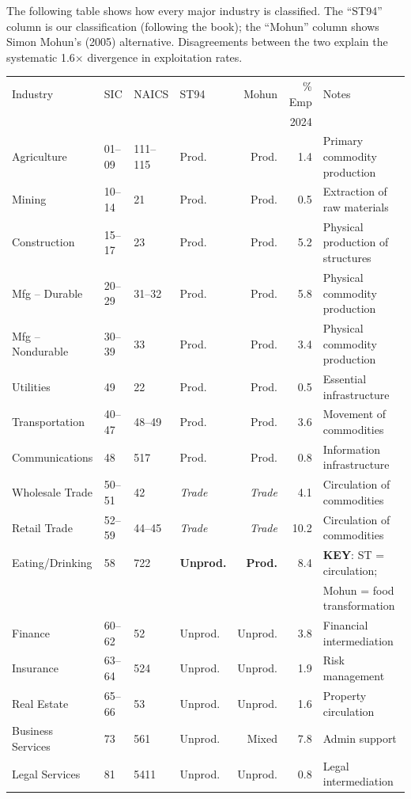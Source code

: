 \documentclass[12pt,a4paper]{article}
\begin{document}
The following table shows how every major industry is classified. The ``ST94'' column is our classification (following the book); the ``Mohun'' column shows Simon Mohun's (2005) alternative. Disagreements between the two explain the systematic 1.6$\times$ divergence in exploitation rates.

\begin{longtable}{llllrrl}
\toprule
Industry & SIC & NAICS & ST94 & Mohun & \% Emp & Notes \\
 & & & & & 2024 & \\
\midrule
\endhead
Agriculture & 01--09 & 111--115 & Prod. & Prod. & 1.4 & Primary commodity production \\
Mining & 10--14 & 21 & Prod. & Prod. & 0.5 & Extraction of raw materials \\
Construction & 15--17 & 23 & Prod. & Prod. & 5.2 & Physical production of structures \\
Mfg -- Durable & 20--29 & 31--32 & Prod. & Prod. & 5.8 & Physical commodity production \\
Mfg -- Nondurable & 30--39 & 33 & Prod. & Prod. & 3.4 & Physical commodity production \\
Utilities & 49 & 22 & Prod. & Prod. & 0.5 & Essential infrastructure \\
Transportation & 40--47 & 48--49 & Prod. & Prod. & 3.6 & Movement of commodities \\
Communications & 48 & 517 & Prod. & Prod. & 0.8 & Information infrastructure \\
\midrule
Wholesale Trade & 50--51 & 42 & \textit{Trade} & \textit{Trade} & 4.1 & Circulation of commodities \\
Retail Trade & 52--59 & 44--45 & \textit{Trade} & \textit{Trade} & 10.2 & Circulation of commodities \\
\midrule
Eating/Drinking & 58 & 722 & \textbf{Unprod.} & \textbf{Prod.} & 8.4 & \textbf{KEY}: ST = circulation; \\
 & & & & & & Mohun = food transformation \\
Finance & 60--62 & 52 & Unprod. & Unprod. & 3.8 & Financial intermediation \\
Insurance & 63--64 & 524 & Unprod. & Unprod. & 1.9 & Risk management \\
Real Estate & 65--66 & 53 & Unprod. & Unprod. & 1.6 & Property circulation \\
Business Services & 73 & 561 & Unprod. & Mixed & 7.8 & Admin support \\
Legal Services & 81 & 5411 & Unprod. & Unprod. & 0.8 & Legal intermediation \\

\end{longtable}
\end{document}
